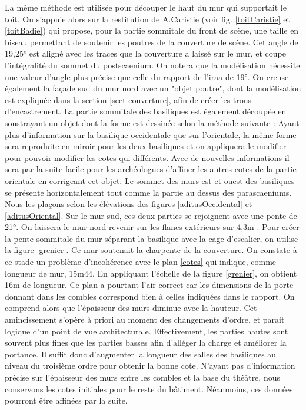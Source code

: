 La même méthode est utilisée pour découper le haut du mur qui supportait le toit. On s'appuie alors sur la restitution de A.Caristie (voir fig. \ref{toitCaristie} et \ref{toitBadie}) qui propose, pour la partie sommitale du front de scène, une taille en biseau permettant de soutenir les poutres de la couverture de scène. Cet angle de 19,25° est aligné avec les traces que la couverture a laissé sur le mur, et coupe l'intégralité du sommet du \gls{postscaenium}. On notera que la modélisation nécessite une valeur d'angle plus précise que celle du rapport de l'\gls{iraa} \cite[fig. 24]{orangeTxt} de 19°. On creuse également la façade sud du mur nord avec un "objet poutre", dont la modélisation est expliquée dans la section \ref{sect-couverture}, afin de créer les trous d'encastrement. La partie sommitale des \glspl{basilique} est également découpée en soustrayant un objet dont la forme est dessinée selon la méthode suivante : 
Ayant plus d'information sur la basilique occidentale que sur l'orientale, la même forme sera reproduite en miroir pour les deux basiliques et on appliquera le modifier pour pouvoir modifier les cotes qui différents. Avec de nouvelles informations il sera par la suite facile pour les archéologues d'affiner les autres cotes de la partie orientale en corrigeant cet objet. Le sommet des murs est et ouest des \glspl{basilique} se présente horizontalement tout comme la partie au dessus des \glspl{parascaenium}. Nous les plaçons selon les élévations des figures \ref{aditusOccidental} et \ref{aditusOriental}. Sur le mur sud, ces deux parties se rejoignent avec une pente de 21°. On laissera le mur nord revenir sur les flancs extérieurs sur 4,3m \cite[p. 38]{orangeTxt}. Pour créer la pente sommitale du mur séparant la \gls{basilique} avec la cage d'escalier, on utilise la figure \ref{grenier}. Ce mur soutenait la charpente de la couverture. On constate à ce stade un problème d'incohérence avec le plan \ref{cotes} qui indique, comme longueur de mur, 15m44. En appliquant l'échelle de la figure \ref{grenier}, on obtient 16m de longueur. Ce plan a pourtant l'air correct car les dimensions de la porte donnant dans les combles correspond bien à celles indiquées dans le rapport. On comprend alors que l'épaisseur des murs diminue avec la hauteur. Cet amincissement s'opère à priori au moment des changements d'ordre, et parait logique d'un point de vue architecturale. Effectivement, les parties hautes sont souvent plus fines que les parties basses afin d'alléger la charge et améliorer la portance. Il suffit donc d'augmenter la longueur des salles des \glspl{basilique} au niveau du troisième ordre pour obtenir la bonne cote. N'ayant pas d'information précise sur l'épaisseur des murs entre les combles et la base du théâtre, nous conservons les cotes initiales pour le reste du bâtiment. Néanmoins, ces données pourront être affinées par la suite.

